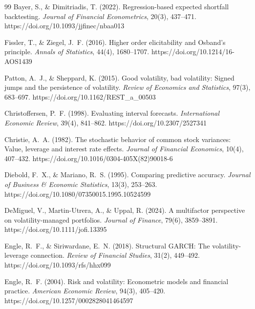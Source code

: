 \documentclass[12pt,a4paper]{article}
\begin{document}
\begin{thebibliography}{99}
Bayer, S., \& Dimitriadis, T. (2022). Regression-based expected shortfall backtesting. \textit{Journal of Financial Econometrics}, 20(3), 437--471. https://doi.org/10.1093/jjfinec/nbaa013

Fissler, T., \& Ziegel, J.~F. (2016). Higher order elicitability and Osband's principle. \textit{Annals of Statistics}, 44(4), 1680--1707. https://doi.org/10.1214/16-AOS1439

Patton, A.~J., \& Sheppard, K. (2015). Good volatility, bad volatility: Signed jumps and the persistence of volatility. \textit{Review of Economics and Statistics}, 97(3), 683--697. https://doi.org/10.1162/REST\_a\_00503


Christoffersen, P.~F. (1998). Evaluating interval forecasts. \textit{International Economic Review}, 39(4), 841--862. https://doi.org/10.2307/2527341

Christie, A.~A. (1982). The stochastic behavior of common stock variances: Value, leverage and interest rate effects. \textit{Journal of Financial Economics}, 10(4), 407--432. https://doi.org/10.1016/0304-405X(82)90018-6

Diebold, F.~X., \& Mariano, R.~S. (1995). Comparing predictive accuracy. \textit{Journal of Business \& Economic Statistics}, 13(3), 253--263. https://doi.org/10.1080/07350015.1995.10524599

DeMiguel, V., Martin-Utrera, A., \& Uppal, R. (2024). A multifactor perspective on volatility-managed portfolios. \textit{Journal of Finance}, 79(6), 3859--3891. https://doi.org/10.1111/jofi.13395

Engle, R.~F., \& Siriwardane, E.~N. (2018). Structural GARCH: The volatility-leverage connection. \textit{Review of Financial Studies}, 31(2), 449--492. https://doi.org/10.1093/rfs/hhx099

Engle, R.~F. (2004). Risk and volatility: Econometric models and financial practice. \textit{American Economic Review}, 94(3), 405--420. https://doi.org/10.1257/0002828041464597


\end{thebibliography}
\end{document}
